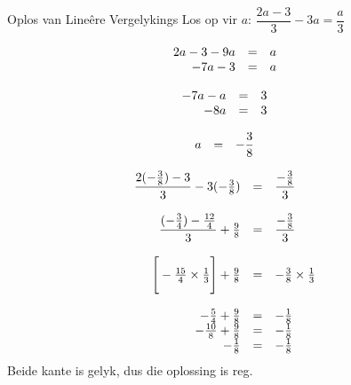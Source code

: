 \begin{wex}
{Oplos van Lineêre Vergelykings}
{Los op vir $a$: $\dfrac{2a-3}{3}-3a=\dfrac{a}{3}$}
{

\begin{equation*}
    \begin{array}{cccc}\hfill 2a-3 - 9a &= &a\hfill & \\ 
\hfill -7a - 3 &= &a\hfill & 
    \end{array}
\end{equation*}

\begin{equation*}
    \begin{array}{cccc}\hfill -7a -a &= &3\hfill & \\ 
\hfill -8a &= &3\hfill & \\
    \end{array}
\end{equation*}

\begin{equation*}
    \begin{array}{cccc}\hfill a &= & -\dfrac{3}{8}\hfill & \\ 

    \end{array}
\end{equation*}

\begin{equation*}
    \begin{array}{ccll}\hfill \dfrac{2(-\frac{3}{8}) - 3}{3} - 3(-\frac{3}{8}) &= & \dfrac{-\frac{3}{8}}{3}\hfill & \\ 
\\
      \hfill \dfrac{(-\frac{3}{4}) - \frac{12}{4}}{3} + \frac{9}{8} &= & \dfrac{-\frac{3}{8}}{3}\hfill & \\ 
\\
 \hfill \Bigg[-\frac{15}{4} \times \frac{1}{3}\Bigg] + \frac{9}{8} &= & -\frac{3}{8} \times \frac{1}{3}\hfill & \\ 
\\
 \hfill -\frac{5}{4} + \frac{9}{8} &= & -\frac{1}{8}\hfill & \\ 
 \hfill -\frac{10}{8} + \frac{9}{8} &= & -\frac{1}{8}\hfill & \\ 
 \hfill -\frac{1}{8} &= & -\frac{1}{8}\hfill & 
    \end{array}
\end{equation*}
Beide kante is gelyk, dus die oplossing is reg.
}
\end{wex}

